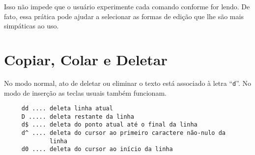 Isso não impede que o usuário experimente cada comando conforme for lendo.
De fato, essa prática pode ajudar a selecionar as formas de edição que lhe
são mais simpáticas ao uso.

\section{Copiar, Colar e Deletar}\label{sec:CopiarColarEDeletar}
No modo normal, ato de deletar ou eliminar o texto está associado
à letra ``\verb|d|''. No modo de inserção as teclas usuais também 
funcionam.

%
\begin{verbatim}
     dd .... deleta linha atual
     D ..... deleta restante da linha
     d$ .... deleta do ponto atual até o final da linha
     d^ .... deleta do cursor ao primeiro caractere não-nulo da 
             linha
     d0 .... deleta do cursor ao início da linha
\end{verbatim}
%
%
